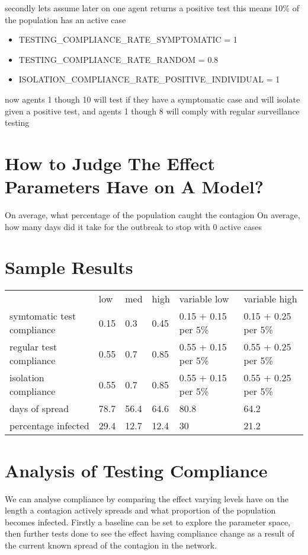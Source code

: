 \documentclass{article}
\begin{document}
secondly lets assume later on one agent returns a positive test this means 10\% of the population has an active case
\begin{itemize}
\item TESTING\_COMPLIANCE\_RATE\_SYMPTOMATIC = 1\
\item TESTING\_COMPLIANCE\_RATE\_RANDOM = 0.8 \
\item ISOLATION\_COMPLIANCE\_RATE\_POSITIVE\_INDIVIDUAL = 1
\end{itemize}
now agents 1 though 10 will test if they have a symptomatic case and will isolate given a positive test, and agents 1 though 8 will comply with regular surveillance testing

\section{How to Judge The Effect Parameters Have on A Model?}
On average, what percentage of the population caught the contagion
On average, how many days did it take for the outbreak to stop with 0 active cases


\pagebreak[1]
\section{Sample Results}
\begin{table}[]
\begin{tabular}{llllll}
                           & low  & med  & high & variable low         & variable high        \\
symtomatic test compliance & 0.15 & 0.3  & 0.45 & 0.15 + 0.15 per 5\%  & 0.15 + 0.25 per 5\%  \\
regular test compliance    & 0.55 & 0.7  & 0.85 & 0.55 + 0.15 per 5\%  & 0.55  + 0.25 per 5\% \\
isolation compliance       & 0.55 & 0.7  & 0.85 & 0.55  + 0.15 per 5\% & 0.55  + 0.25 per 5\% \\
days of spread             & 78.7 & 56.4 & 64.6 & 80.8                 & 64.2                 \\
percentage infected        & 29.4 & 12.7 & 12.4 & 30                   & 21.2                
\end{tabular}
\end{table}

\section{Analysis of Testing Compliance}
We can analyse compliance by comparing the effect varying levels have on the length a contagion actively spreads and what proportion of the population becomes infected. Firstly a baseline can be set to explore the parameter space, then further tests done to see the effect having compliance change as a result of the current known spread of the contagion in the network.
\end{document}
